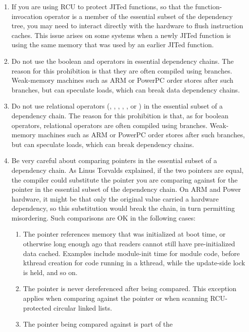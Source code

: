 \documentclass[letterpaper,twocolumn,10pt]{article}
\begin{document}
\begin{enumerate}
\item	If you are using RCU to protect JITed functions, so that the
	\co{()} function-invocation operator is a member of the
	essential subset of the dependency tree, you may need to
	interact directly with the hardware to flush instruction
	caches.
	This issue arises on some systems when a newly JITed function
	is using the same memory that was used by an earlier JITed
	function.
\item	Do not use the boolean \co{&&} and \co{||}
	operators in essential dependency chains.
	The reason for this prohibition is that
	they are often compiled using branches.
	Weak-memory machines such as ARM or PowerPC order stores after
	such branches, but can speculate loads, which can break
	data dependency chains.
\item	Do not use relational operators (\co{==}, \co{!=}, \co{>}, \co{>=},
	\co{<}, or \co{<=}) in the essential subset of a
	dependency chain.
	The reason for this prohibition is that, as for boolean operators,
	relational operators are often compiled using branches.
	Weak-memory machines such as ARM or PowerPC order stores after
	such branches, but can speculate loads, which can break
	dependency chains.
\item	Be very careful about comparing pointers in the essential subset
	of a dependency chain.
	\label{listitem:Dependency Chain Pointer Comparison Hazards}
	As Linus Torvalds explained, if the two pointers are equal,
	the compiler could substitute the
	pointer you are comparing against for the pointer in the
	essential subset of the dependency chain.
	On ARM and Power hardware, it might be that only the original
	value carried a hardware dependency, so this substitution would
	break the chain, in turn permitting misordering.
	Such comparisons are OK in the following cases:
	\begin{enumerate}
	\item	The pointer references memory
		that was initialized at boot time, or otherwise long enough
		ago that readers cannot still have pre-initialized data
		cached.
		Examples include module-init time for module code,
		before kthread creation for code running in a kthread,
		while the update-side lock is held, and so on.
	\item	The pointer is never dereferenced after being compared.
		This exception applies when comparing against the
		 pointer or when scanning RCU-protected
		circular linked lists.
	\item	The pointer being compared against is part of the

\end{enumerate}
\end{enumerate}
\end{document}
